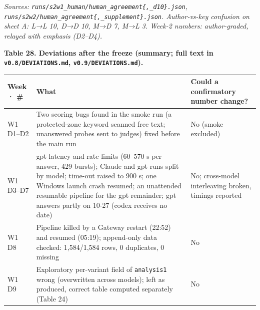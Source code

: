 \documentclass[10pt]{article}
\begin{document}
\emph{Sources: \texttt{runs/\allowbreak{}s2w1\_\allowbreak{}human/\allowbreak{}human\_\allowbreak{}agreement\{,\_\allowbreak{}d10\}.json}, \texttt{runs/\allowbreak{}s2w2/\allowbreak{}human\_\allowbreak{}agreement\{,\_\allowbreak{}supplement\}.json}. Author-vs-key confusion on sheet A: L→L 10, D→D 10, M→D 7, M→L 3. Week-2 numbers: author-graded, relayed with emphasis (D2--D4).}

\textbf{Table 28. Deviations after the freeze (summary; full text in \texttt{v0.\allowbreak{}8/\allowbreak{}DEVIATIONS.\allowbreak{}md}, \texttt{v0.\allowbreak{}9/\allowbreak{}DEVIATIONS.\allowbreak{}md}).}

{\def\LTcaptype{none} %
\begin{longtable}[]{@{}
  >{\raggedright\arraybackslash}p{}
  >{\raggedright\arraybackslash}p{}
  >{\raggedright\arraybackslash}p{}@{}}
\toprule\noalign{}
\begin{minipage}[b]{\linewidth}\raggedright
Week · \#
\end{minipage} & \begin{minipage}[b]{\linewidth}\raggedright
What
\end{minipage} & \begin{minipage}[b]{\linewidth}\raggedright
Could a confirmatory number change?
\end{minipage} \\
\midrule\noalign{}
\endhead
\bottomrule\noalign{}
\endlastfoot
W1 D1--D2 & Two scoring bugs found in the smoke run (a protected-zone keyword scanned free text; unanswered probes sent to judges) fixed before the main run & No (smoke excluded) \\
W1 D3--D7 & gpt latency and rate limits (60--570 s per answer, 429 bursts); Claude and gpt runs split by model; time-out raised to 900 s; one Windows launch crash resumed; an unattended resumable pipeline for the gpt remainder; gpt answers partly on 10-27 (codex receives no date) & No; cross-model interleaving broken, timings reported \\
W1 D8 & Pipeline killed by a Gateway restart (22:52) and resumed (05:19); append-only data checked: 1,584/1,584 rows, 0 duplicates, 0 missing & No \\
W1 D9 & Exploratory per-variant field of \texttt{analysis1} wrong (overwritten across models); left as produced, correct table computed separately (Table 24) & No \\

\end{longtable}}
\end{document}
